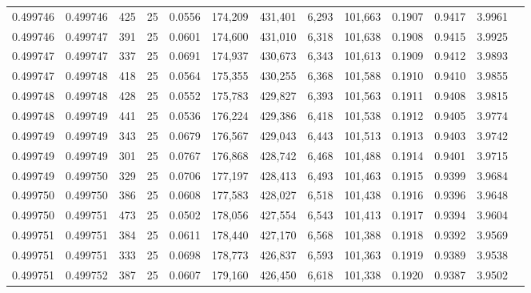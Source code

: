 \begin{tabular}{rrrrrrrrrrrrr}
0.499746 & 0.499746 &   425 &  25 &                                     0.0556 & 174,209 & 431,401 &   6,293 & 101,663 & 0.1907 & 0.9417 & 3.9961 \\
0.499746 & 0.499747 &   391 &  25 &                                     0.0601 & 174,600 & 431,010 &   6,318 & 101,638 & 0.1908 & 0.9415 & 3.9925 \\
0.499747 & 0.499747 &   337 &  25 &                                     0.0691 & 174,937 & 430,673 &   6,343 & 101,613 & 0.1909 & 0.9412 & 3.9893 \\
0.499747 & 0.499748 &   418 &  25 &                                     0.0564 & 175,355 & 430,255 &   6,368 & 101,588 & 0.1910 & 0.9410 & 3.9855 \\
0.499748 & 0.499748 &   428 &  25 &                                     0.0552 & 175,783 & 429,827 &   6,393 & 101,563 & 0.1911 & 0.9408 & 3.9815 \\
0.499748 & 0.499749 &   441 &  25 &                                     0.0536 & 176,224 & 429,386 &   6,418 & 101,538 & 0.1912 & 0.9405 & 3.9774 \\
0.499749 & 0.499749 &   343 &  25 &                                     0.0679 & 176,567 & 429,043 &   6,443 & 101,513 & 0.1913 & 0.9403 & 3.9742 \\
0.499749 & 0.499749 &   301 &  25 &                                     0.0767 & 176,868 & 428,742 &   6,468 & 101,488 & 0.1914 & 0.9401 & 3.9715 \\
0.499749 & 0.499750 &   329 &  25 &                                     0.0706 & 177,197 & 428,413 &   6,493 & 101,463 & 0.1915 & 0.9399 & 3.9684 \\
0.499750 & 0.499750 &   386 &  25 &                                     0.0608 & 177,583 & 428,027 &   6,518 & 101,438 & 0.1916 & 0.9396 & 3.9648 \\
0.499750 & 0.499751 &   473 &  25 &                                     0.0502 & 178,056 & 427,554 &   6,543 & 101,413 & 0.1917 & 0.9394 & 3.9604 \\
0.499751 & 0.499751 &   384 &  25 &                                     0.0611 & 178,440 & 427,170 &   6,568 & 101,388 & 0.1918 & 0.9392 & 3.9569 \\
0.499751 & 0.499751 &   333 &  25 &                                     0.0698 & 178,773 & 426,837 &   6,593 & 101,363 & 0.1919 & 0.9389 & 3.9538 \\
0.499751 & 0.499752 &   387 &  25 &                                     0.0607 & 179,160 & 426,450 &   6,618 & 101,338 & 0.1920 & 0.9387 & 3.9502 \\

\end{tabular}
